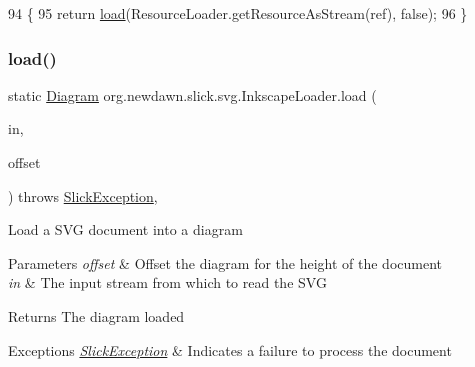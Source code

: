 \begin{DoxyCode}
94                                                                  \{
95         \textcolor{keywordflow}{return} \mbox{\hyperlink{classorg_1_1newdawn_1_1slick_1_1svg_1_1_inkscape_loader_a740ecc54efa6c6f4794f966ee42585cf}{load}}(ResourceLoader.getResourceAsStream(ref), \textcolor{keyword}{false});
96     \}
\end{DoxyCode}
\mbox{\label{classorg_1_1newdawn_1_1slick_1_1svg_1_1_inkscape_loader_a315ddcd083502a6f86361ed87372673e}} 
\subsubsection{\texorpdfstring{load()}{load()}\hspace{0.1cm}{\footnotesize\ttfamily [3/3]}}
{\footnotesize\ttfamily static \mbox{\hyperlink{classorg_1_1newdawn_1_1slick_1_1svg_1_1_diagram}{Diagram}} org.\+newdawn.\+slick.\+svg.\+Inkscape\+Loader.\+load (\begin{DoxyParamCaption}\item[{Input\+Stream}]{in,  }\item[{boolean}]{offset }\end{DoxyParamCaption}) throws \mbox{\hyperlink{classorg_1_1newdawn_1_1slick_1_1_slick_exception}{Slick\+Exception}}\hspace{0.3cm}{\ttfamily [inline]}, {\ttfamily [static]}}

Load a S\+VG document into a diagram


\begin{DoxyParams}{Parameters}
{\em offset} & Offset the diagram for the height of the document \\
\hline
{\em in} & The input stream from which to read the S\+VG \\
\hline
\end{DoxyParams}
\begin{DoxyReturn}{Returns}
The diagram loaded 
\end{DoxyReturn}

\begin{DoxyExceptions}{Exceptions}
{\em \mbox{\hyperlink{classorg_1_1newdawn_1_1slick_1_1_slick_exception}{Slick\+Exception}}} & Indicates a failure to process the document \\
\hline
\end{DoxyExceptions}


